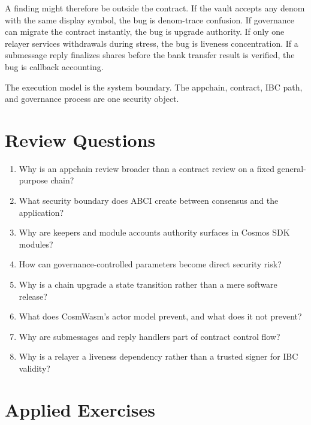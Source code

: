 A finding might therefore be outside the contract. If the vault accepts any denom with the same display symbol, the bug is denom-trace confusion. If governance can migrate the contract instantly, the bug is upgrade authority. If only one relayer services withdrawals during stress, the bug is liveness concentration. If a submessage reply finalizes shares before the bank transfer result is verified, the bug is callback accounting.

The execution model is the system boundary. The appchain, contract, IBC path, and governance process are one security object.

\section*{Review Questions}

\begin{enumerate}
\item Why is an appchain review broader than a contract review on a fixed general-purpose chain?
\item What security boundary does ABCI create between consensus and the application?
\item Why are keepers and module accounts authority surfaces in Cosmos SDK modules?
\item How can governance-controlled parameters become direct security risk?
\item Why is a chain upgrade a state transition rather than a mere software release?
\item What does CosmWasm's actor model prevent, and what does it not prevent?
\item Why are submessages and reply handlers part of contract control flow?
\item Why is a relayer a liveness dependency rather than a trusted signer for IBC validity?
\end{enumerate}

\section*{Applied Exercises}

